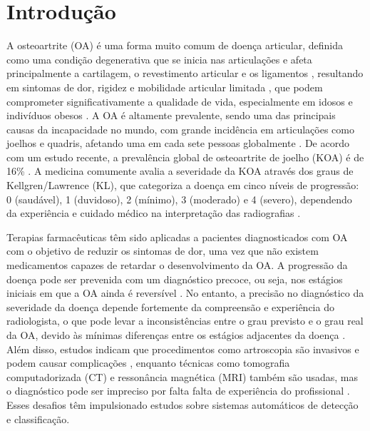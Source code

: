 
\chapter*[Introdução]{Introdução}

A osteoartrite (OA) é uma forma muito comum de doença articular, definida como uma condição degenerativa que se inicia nas articulações e afeta principalmente a cartilagem, o revestimento articular e os ligamentos \cite{Sardim2020}, resultando em sintomas de dor, rigidez e mobilidade articular limitada \cite{PACCA2018}, que podem comprometer significativamente a qualidade de vida, especialmente em idosos e indivíduos obesos \cite{Luis2022}. A OA é altamente prevalente, sendo uma das principais causas da incapacidade no mundo, com grande incidência em articulações como joelhos e quadris, afetando uma em cada sete pessoas globalmente \cite{KELLGREN1957}. De acordo com um estudo recente, a prevalência global de osteoartrite de joelho (KOA) é de 16\% \cite{Tariq2023}. A medicina comumente avalia a severidade da KOA através dos graus de Kellgren/Lawrence (KL), que categoriza a doença em cinco níveis de progressão: 0 (saudável), 1 (duvidoso), 2 (mínimo), 3 (moderado) e 4 (severo), dependendo da experiência e cuidado médico na interpretação das radiografias \cite{KELLGREN1957}.

Terapias farmacêuticas têm sido aplicadas a pacientes diagnosticados com OA com o objetivo de reduzir os sintomas de dor, uma vez que não existem medicamentos capazes de retardar o desenvolvimento da OA. A progressão da doença  pode ser prevenida com um diagnóstico precoce, ou seja, nos estágios iniciais em que a OA ainda é reversível \cite{Kanamoto2020}. No entanto, a precisão no diagnóstico da severidade da doença depende fortemente da compreensão e experiência do radiologista, o que pode levar a inconsistências entre o grau previsto e o grau real da OA, devido às mínimas diferenças entre os estágios adjacentes da doença \cite{Mohammed2023}. Além disso, estudos indicam que procedimentos como artroscopia são invasivos e podem causar complicações \cite{Saraev2020}, enquanto técnicas como tomografia computadorizada (CT) e ressonância magnética (MRI) também são usadas, mas o diagnóstico pode ser impreciso por falta falta de experiência do profissional \cite{Alshamrani2023}. Esses desafios têm impulsionado estudos sobre sistemas automáticos de detecção e classificação.

